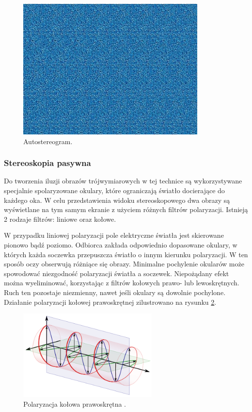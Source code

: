 \begin{figure}[H]
		\centering
 		\includegraphics[width=9.5cm]{68.jpg}
    	\caption{Autostereogram\cite{autostereogram}.}
 		\label{rys26}
\end{figure}

\subsubsection{Stereoskopia pasywna} 
Do tworzenia iluzji obrazów trójwymiarowych w tej technice są wykorzystywane specjalnie spolaryzowane okulary, które ograniczają światło docierające do każdego oka. W celu przedstawienia widoku stereoskopowego dwa obrazy są wyświetlane na tym samym ekranie z użyciem różnych filtrów polaryzacji. Istnieją 2 rodzaje filtrów: liniowe oraz kołowe.

W przypadku liniowej polaryzacji pole elektryczne światła jest skierowane pionowo bądź poziomo. Odbiorca zakłada odpowiednio dopasowane okulary, w których każda soczewka przepuszcza światło o innym kierunku polaryzacji. W ten sposób oczy obserwują różniące się obrazy. Minimalne pochylenie okularów może spowodować niezgodność polaryzacji światła a soczewek. Niepożądany efekt można wyeliminować, korzystając z filtrów kołowych prawo- lub lewoskrętnych. Ruch ten pozostaje niezmienny, nawet jeśli okulary są dowolnie pochylone\cite{russianpage}. Działanie polaryzacji kołowej prawoskrętnej zilustrowano na rysunku \ref{rys3}. 

\begin{figure}[H]
		\centering
 		\includegraphics[width=7.0cm]{circular.png}
    	\caption{Polaryzacja kołowa prawoskrętna \cite{polarization}.}
 		\label{rys3}
\end{figure}

